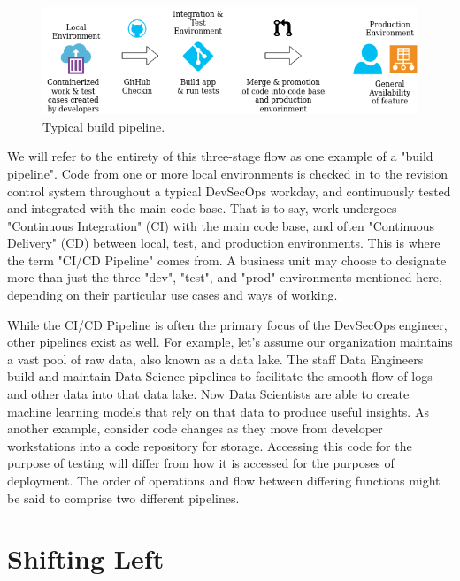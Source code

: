 \begin{figure}[!htb]
	\centering
	\includegraphics[scale=0.63]{../images/flow.png}
	\caption{Typical build pipeline.}
	\label{fig:pipeline}
\end{figure}

\justify
We will refer to the entirety of this three-stage flow as one example of
a "build pipeline". Code from one or more local environments is checked in to
the revision control system throughout a typical DevSecOps workday, and
continuously tested and integrated with the main code base. That is to
say, work undergoes "Continuous Integration" (CI)
with the main code base, and often "Continuous Delivery" (CD)
between local, test, and production environments. This is where the term
"CI/CD Pipeline" comes from. A business unit may choose to designate more
than just the three "dev", "test", and "prod" environments mentioned here,
depending on their particular use cases and ways of working. 

\justify
While the CI/CD Pipeline is often the primary focus of the DevSecOps
engineer, other pipelines exist as well. For example, let's assume our
organization maintains a vast pool of raw data, also known as a data
lake. The staff Data Engineers build and maintain 
Data Science pipelines to facilitate the smooth flow
of logs and other data into that data lake. Now Data Scientists are able
to create machine learning models that rely on that data to produce useful
insights. As another example, consider code changes as they move from
developer workstations into a code repository for storage. Accessing
this code for the purpose of testing will differ from how it is accessed
for the purposes of deployment. The order of operations and flow
between differing functions might be said to comprise two different pipelines.

\section{Shifting Left}

